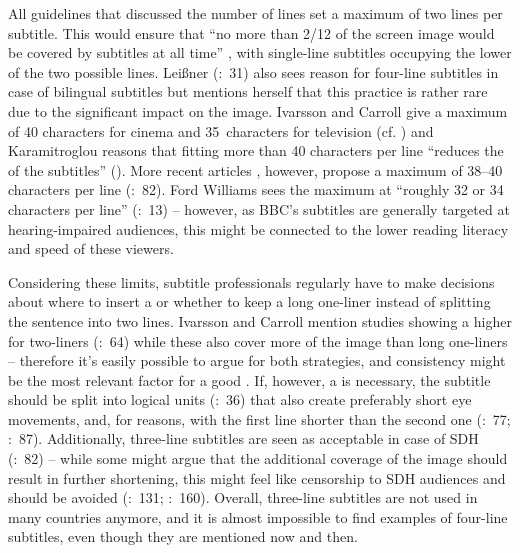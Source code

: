 All guidelines that discussed the number of lines set a maximum of two lines per subtitle. This would ensure that “no more than 2/12 of the screen image would be covered by subtitles at all time” \citep{Karamitroglou1998}, with single-line subtitles occupying the lower of the two possible lines. Leißner (\citeyear{Leisner2009}:~31) also sees reason for four-line subtitles in case of bilingual subtitles but mentions herself that this practice is rather rare due to the significant impact on the image. Ivarsson and Carroll give a maximum of 40 characters for cinema and 35~characters for television (cf. \citealt{Karamitroglou1998}) and Karamitroglou reasons that fitting more than 40 characters per line “reduces the  of the subtitles” (\citealt{Karamitroglou1998}). More recent articles , however, propose a maximum of 38--40 characters per line (\citealt{Diaz_cintas2007b}:~82). Ford Williams sees the maximum at “roughly 32 or 34 characters per line” (\citeyear{Ford_williams2009}:~13) – however, as BBC’s subtitles are generally targeted at hearing-impaired audiences, this might be connected to the lower reading literacy and speed of these viewers.

\largerpage
Considering these limits, subtitle professionals regularly have to make decisions about where to insert a  or whether to keep a long one-liner instead of splitting the sentence into two lines. Ivarsson and Carroll mention studies showing a higher  for two-liners (\citeyear{Ivarsson1998}:~64) while these also cover more of the image than long one-liners – therefore it’s easily possible to argue for both strategies, and consistency might be the most relevant factor for a good . If, however, a  is necessary, the subtitle should be split into logical units (\citealt{Leisner2009}:~36) that also create preferably short eye movements, and, for  reasons, with the first line shorter than the second one (\citealt{Ivarsson1998}:~77; \citealt{Diaz_cintas2007b}:~87). Additionally, three-line subtitles are seen as acceptable in case of SDH (\citealt{Diaz_cintas2007b}:~82) – while some might argue that the additional coverage of the image should result in further shortening, this might feel like censorship to SDH audiences and should be avoided (\citealt{Jungst2010}:~131; \citealt{neves2009}:~160). Overall, three-line subtitles are not used in many countries anymore, and it is almost impossible to find examples of four-line subtitles, even though they are mentioned now and then.

